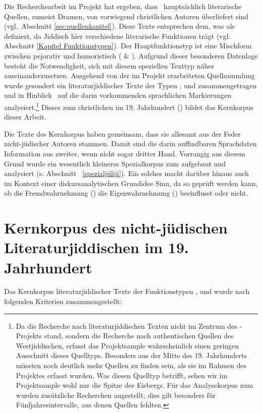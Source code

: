 Die Recherchearbeit im Projekt  hat ergeben, dass \,%
hauptsächlich literarische Quellen, zumeist Dramen, von vorwiegend christlichen Autoren überliefert sind (vgl.\, Abschnitt %
\ref{sec:quellenkapitel}). Diese Texte entsprechen dem, was \cite{Richter1995} als  definiert, da Jiddisch hier verschiedene literarische Funktionen trägt (vgl.\, Abschnitt \ref{Kapitel Funktionstypen}). Der Hauptfunktionstyp ist eine Mischform zwischen pejorativ und humoristisch ( \& ). Aufgrund dieser besonderen Datenlage besteht die Notwendigkeit, sich mit diesem speziellen Texttyp näher auseinanderzusetzen. Ausgehend von der im Projekt erarbeiteten Quellsammlung wurde gesondert ein  literaturjiddischer Texte der Typen ,  und  zusammengetragen und in Hinblick \,%
auf die darin vorkommenden sprachlichen Markierungen analysiert.\footnote{Da die Recherche nach literaturjiddischen Texten nicht im Zentrum des -Projekts stand, sondern die Recherche nach authentischen Quellen des Westjiddischen, erfasst das Projektsample wahrscheinlich einen geringen Ausschnitt dieses Quelltyps. Besonders aus der Mitte des 19. Jahrhunderts müssten noch deutlich mehr Quellen zu finden sein, als sie im Rahmen des Projektes erfasst wurden. Was diesen Quelltyp betrifft, sehen wir im Projektsample wohl nur die Spitze des Eisbergs. Für das Analysekorpus zum  wurden zusätzliche Recherchen angestellt; dies gilt besonders für Fünfjahresintervalle, aus denen Quellen fehlten.} Dieses  zum christlichen  im 19. Jahrhundert () bildet das Kernkorpus dieser Arbeit.  

Die Texte des Kernkorpus haben gemeinsam, dass sie allesamt aus der Feder nicht-jüdischer Autoren stammen. Damit sind die darin auffindbaren Sprachdaten Information aus zweiter, wenn nicht sogar dritter Hand. Vorrangig aus diesem Grund wurde ein wesentlich kleineres Spezialkorpus zum  aufgebaut und analysiert (s. Abschnitt \,%
 \ref{spezialjüliji}). Ein solches macht darüber hinaus auch im Kontext einer diskursanalytischen Grundidee Sinn, da so geprüft werden kann, ob die Fremdwahrnehmung () die Eigenwahrnehmung () beeinflusst oder nicht. 
  
  \section{Kernkorpus des nicht-jüdischen Literaturjiddischen im 19. Jahrhundert}\label{kernkorpus}
 Das Kernkorpus literaturjiddischer Texte der Funktionstypen ,  und  wurde nach folgenden Kriterien zusammengestellt:
 
